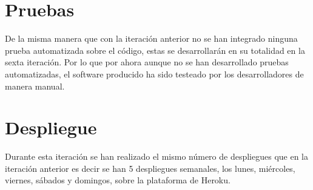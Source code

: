 
\clearpage

\section{Pruebas}

De la misma manera que con la iteración anterior no se han integrado ninguna prueba automatizada sobre el código, estas se desarrollarán en su totalidad en la sexta iteración. Por lo que por ahora aunque no se han desarrollado pruebas automatizadas, el software producido ha sido testeado por los desarrolladores de manera manual.

\section{Despliegue}

Durante esta iteración se han realizado el mismo número de despliegues que en la iteración anterior es decir se han 5 despliegues semanales, los lunes, miércoles, viernes, sábados y domingos, sobre la plataforma de Heroku.